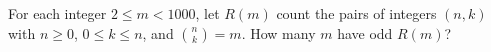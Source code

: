 For each integer $2\le m<1000$, let $R(m)$ count the pairs of integers $(n,k)$ with $n\ge0$, $0\le k\le n$, and $\binom nk=m$. How many $m$ have odd $R(m)$?
